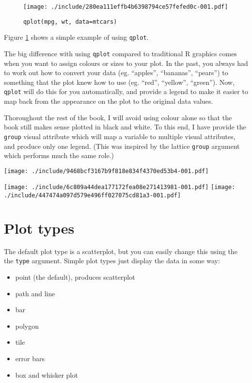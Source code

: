 \begin{figure}[htbp]
	\begin{center}
\texttt{[image: ./include/280ea111effb4b6398794ce57fefed0c-001.pdf]}
	\end{center}
	\caption{{\tt qplot(mpg, wt, data=mtcars)}}
	
	\label{fig:first}
\end{figure}

Figure \ref{fig:first} shows a simple example of using {\tt qplot}.

The big difference with using {\tt qplot} compared to traditional R graphics comes when you want to assign colours or sizes to your plot.  In the past, you always had to work out how to convert your data (eg. ``apples'', ``bananas'', ``pears'') to something that the plot knew how to use (eg. ``red'', ``yellow'', ``green'').  Now, {\tt qplot} will do this for you automatically, and provide a legend to make it easier to map back from the appearance on the plot to the original data values.

Thoroughout the rest of the book, I will avoid using colour alone so that the book still makes sense plotted in black and white.  To this end, I have provide the {\tt group} visual attribute which will map a variable to multiple visual attributes, and produce only one legend.  (This was inspired by the lattice {\tt group} argument which performs much the same role.)

\texttt{[image: ./include/9468bcf3167b9f818e834f4370ed53b4-001.pdf]}

\texttt{[image: ./include/6c809a44dea177172fea08e271413981-001.pdf]}
\texttt{[image: ./include/447474a097d579e496ff027075cd81a3-001.pdf]}

\section{Plot types}\label{sec:plot_types}

The default plot type is a scatterplot, but you can easily change this using the the {\tt type} argument.  Simple plot types just display the data in some way:

\begin{itemize}
	\item point (the default), produces scatterplot
	\item path and line
	\item bar
	\item polygon
	\item tile
	\item error bars
	\item box and whisker plot
\end{itemize}


